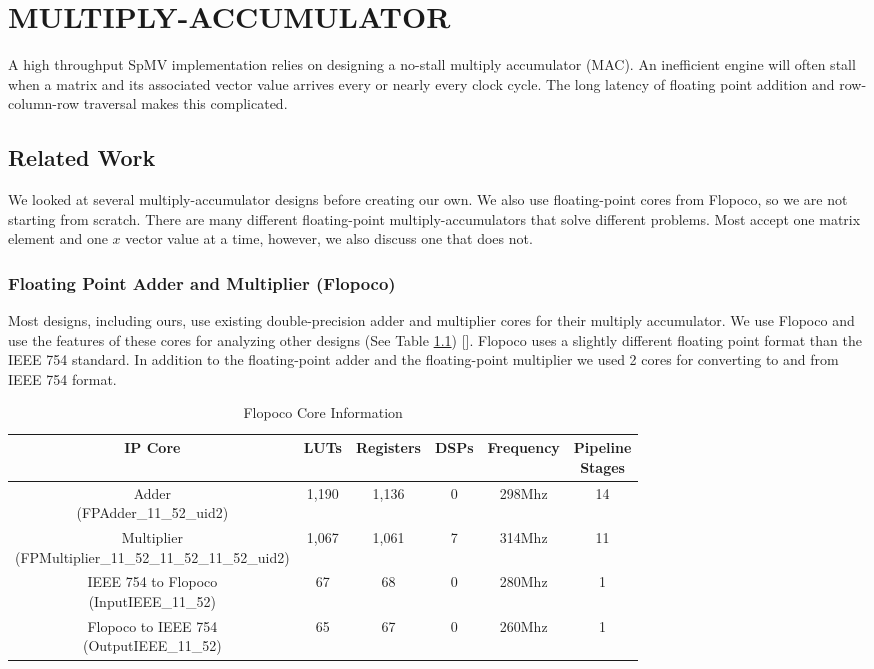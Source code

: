 \chapter{MULTIPLY-ACCUMULATOR}
\label{chp:mac}
A high throughput SpMV implementation relies on designing a no-stall multiply accumulator (MAC). An inefficient engine will often stall when a matrix and its associated vector value arrives every or nearly every clock cycle. The long latency of floating point addition and row-column-row traversal makes this complicated.

\section{Related Work}
\label{sec:mac_related_work}
We looked at several multiply-accumulator designs before creating our own. We also use floating-point cores from Flopoco, so we are not starting from scratch. There are many different floating-point multiply-accumulators that solve different problems. Most accept one matrix element and one $x$ vector value at a time, however, we also discuss one that does not.
\subsection{Floating Point Adder and Multiplier (Flopoco)}
Most designs, including ours, use existing double-precision adder and multiplier cores for their multiply accumulator. We use Flopoco and use the features of these cores for analyzing other designs (See Table \ref{tbl:flopoco}) [\cite{prelim:dedinechin,prelim:banescu,prelim:dedinechin2}]. Flopoco uses a slightly different floating point format than the IEEE 754 standard. In addition to the floating-point adder and the floating-point multiplier we used 2 cores for converting to and from IEEE 754 format.

\begin{table}
    \caption{Flopoco Core Information}
    \label{tbl:flopoco}
    \begin{tabular}{|c|ccccc|}
        \hline
        IP Core & LUTs & Registers & DSPs & Frequency & \shortstack{Pipeline\\Stages} \\
        \hline
        \shortstack{Adder\\(FPAdder\_11\_52\_uid2)} & 1,190 & 1,136 & 0 & 298Mhz & 14 \\
        \hline
        \shortstack{Multiplier\\(FPMultiplier\_11\_52\_11\_52\_11\_52\_uid2)} & 1,067 & 1,061 & 7 & 314Mhz & 11 \\
        \hline
        \shortstack{IEEE 754 to Flopoco\\(InputIEEE\_11\_52)} & 67 & 68 & 0 & 280Mhz & 1 \\
        \hline
        \shortstack{Flopoco to IEEE 754\\(OutputIEEE\_11\_52)} & 65 & 67 & 0 & 260Mhz & 1 \\
        \hline
    \end{tabular}
\end{table}

